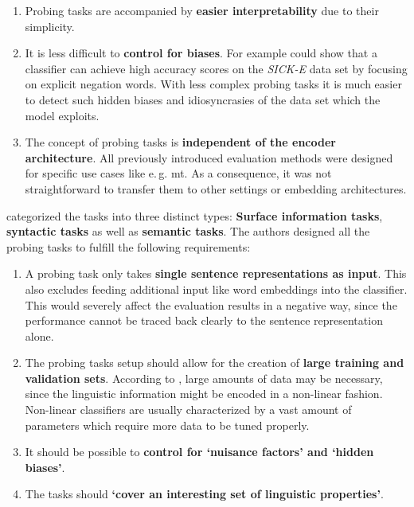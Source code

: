 \begin{enumerate}[label=\color{tud9c}\textbf{\theenumi.}]
	\item Probing tasks are accompanied by \textbf{easier interpretability} due to their simplicity.
	\item It is less difficult to \textbf{control for biases}. For example \citep{Lai.2014} could show that a
 		classifier can achieve high accuracy scores on the \textit{SICK-E} data set \citep{Marelli.2014} by
 		focusing on explicit negation words. With less complex probing tasks it is much easier to detect such hidden biases and idiosyncrasies
 		of the data set which the model exploits.
	\item The concept of probing tasks is \textbf{independent of the encoder architecture}. All previously introduced
	 	evaluation methods were designed for specific use cases like e.\,g. \gls{mt}. As a consequence, it was not straightforward to
 		transfer them to other settings or embedding architectures.
\end{enumerate}

\citep{Conneau.2018a} categorized the tasks into three distinct types:  \textbf{Surface information tasks},  \textbf{syntactic tasks} as well as  \textbf{semantic tasks}. The authors designed all the probing tasks to fulfill the following requirements:

\begin{enumerate}[label=\color{tud9c}\textbf{\theenumi.}]
	\item A probing task only takes \textbf{single sentence representations as input}. This also excludes feeding additional input
	 	like word embeddings into the classifier. This would severely affect the evaluation results in a negative way, since the
 		performance cannot be traced back clearly to the sentence representation alone.
	\item The probing tasks setup should allow for the creation of
		\textbf{large training and validation sets}. According to \citep{Conneau.2018a}, large amounts of data may be necessary,
		 since the linguistic information might be encoded in a non-linear fashion. Non-linear classifiers are usually characterized
		 by a vast amount of parameters which require more data to be tuned properly.
	\item It should be possible to \textbf{control for `nuisance factors' and `hidden biases'}.
	\item The tasks should \textbf{`cover an interesting set of linguistic properties'}.
\end{enumerate}

